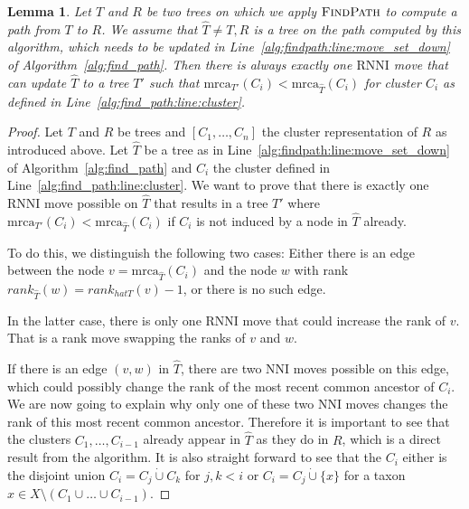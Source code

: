 \documentclass{amsart}
\newcommand{\mrca}{\mathrm{mrca}}
\newcommand{\nni}{\mathrm{NNI}}
\newcommand{\rnni}{\mathrm{RNNI}}
\newcommand{\findpath}{\textsc{FindPath}}
\newtheorem{lemma}[definition]{Lemma}
\begin{document}
\begin{lemma}
    Let $T$ and $R$ be two trees on which we apply $\findpath$ to compute a path from $T$ to $R$.
    We assume that $\hat T \neq T,R$ is a tree on the path computed by this algorithm, which needs to be updated in Line~\ref{alg:findpath:line:move_set_down} of Algorithm~\ref{alg:find_path}.
    Then there is always exactly one $\rnni$ move that can update $\hat T$ to a tree $T'$ such that $\mrca_{T'}(C_i) < \mrca_{\hat T}(C_i)$ for cluster $C_i$ as defined in Line~\ref{alg:find_path:line:cluster}.
    \label{lemma:mrca_move}
\end{lemma}

\begin{proof}


    Let $T$ and $R$ be trees and $[C_1, \ldots, C_n]$ the cluster representation
    of $R$ as introduced above.
    Let $\hat T$ be a tree as in Line~\ref{alg:findpath:line:move_set_down} of Algorithm~\ref{alg:find_path} and $C_i$ the cluster defined in Line~\ref{alg:find_path:line:cluster}.
    We want to prove that there is exactly one $\rnni$ move possible on $\hat T$ that results in a tree $T'$ where $\mrca_{T'}(C_i) < \mrca_{\hat T}(C_i)$ if $C_i$ is not induced by a node in $\hat T$ already.

    To do this, we distinguish the following two cases:
    Either there is an edge between the node $v = \mrca_{\hat T}(C_i)$ and the node $w$ with rank $rank_{\hat T}(w) = rank_{hat T}(v) - 1$, or there is no such edge.

    In the latter case, there is only one $\rnni$ move that could increase the rank of $v$.
    That is a rank move swapping the ranks of $v$ and $w$.

    If there is an edge $(v,w)$ in $\hat T$, there are two $\nni$ moves possible on this edge, which could possibly change the rank of the most recent common ancestor of $C_i$.
    We are now going to explain why only one of these two $\nni$ moves changes the rank of this most recent common ancestor.
    Therefore it is important to see that the clusters $C_1, \ldots, C_{i-1}$ already appear in $\hat T$ as they do in $R$, which is a direct result from the algorithm.
    It is also straight forward to see
    that the $C_i$ either is the disjoint union $C_i = C_j \dot\cup C_k$ for $j,k < i$ or $C_i = C_j \dot\cup \{x\}$ for a taxon $x \in X \setminus (C_1 \cup \ldots \cup C_{i-1})$.


\end{proof}
\end{document}
